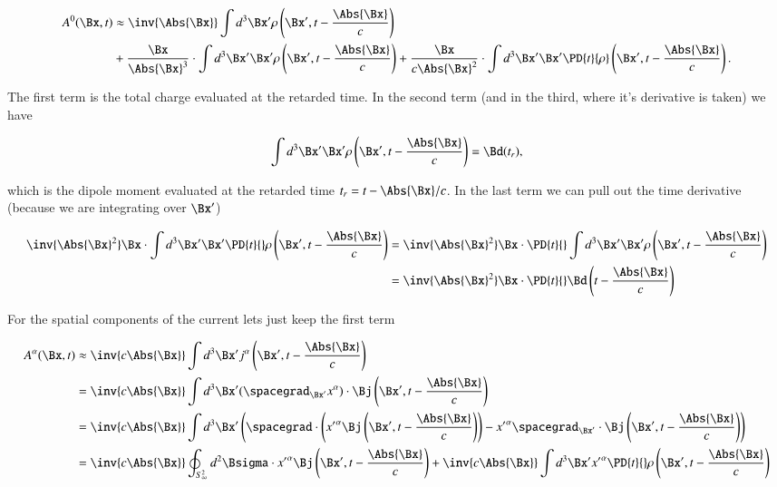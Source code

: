 \begin{equation}\label{eqn:relativisticElectrodynamicsL20:210}
\begin{aligned}
A^0(\Bx, t) 
&\approx 
\inv{\Abs{\Bx} } \int d^3 \Bx' \rho\left(\Bx', t - \frac{\Abs{\Bx} }{c}\right) \\
&+\frac{\Bx}{\Abs{\Bx}^3} \cdot \int d^3 \Bx' \Bx' \rho \left(\Bx', t - \frac{\Abs{\Bx} }{c}\right)
+\frac{\Bx}{c \Abs{\Bx}^2} \cdot \int d^3 \Bx' \Bx' \PD{t}{\rho}\left(\Bx', t - \frac{\Abs{\Bx} }{c}\right).
\end{aligned}
\end{equation}

The first term is the total charge evaluated at the retarded time.  In the second term (and in the third, where it's derivative is taken) we have

\begin{equation}\label{eqn:relativisticElectrodynamicsL20:230}
\int d^3 \Bx' \Bx' \rho\left(\Bx', t - \frac{\Abs{\Bx} }{c}\right) = \Bd(t_r),
\end{equation}

which is the dipole moment evaluated at the retarded time $t_r = t - \Abs{\Bx}/c$.  In the last term we can pull out the time derivative (because we are integrating over $\Bx'$)

\begin{align*}
\inv{\Abs{\Bx}^2} \Bx \cdot \int d^3 \Bx' \Bx' \PD{t}{} \rho\left(\Bx', t - \frac{\Abs{\Bx} }{c}\right)
&=
\inv{\Abs{\Bx}^2} \Bx \cdot \PD{t}{} \int d^3 \Bx' \Bx' \rho\left(\Bx', t - \frac{\Abs{\Bx} }{c}\right) \\
&=
\inv{\Abs{\Bx}^2} \Bx \cdot \PD{t}{}\Bd \left(t - \frac{\Abs{\Bx} }{c}\right)
\end{align*}

For the spatial components of the current lets just keep the first term

\begin{align*}
A^\alpha(\Bx, t) 
&\approx
\inv{ c \Abs{\Bx} } \int d^3 \Bx' j^\alpha\left(\Bx', t - \frac{\Abs{\Bx} }{c}\right) \\
&=
\inv{ c \Abs{\Bx} } \int d^3 \Bx' (\spacegrad_{\Bx'} x^\alpha) \cdot \Bj\left(\Bx', t - \frac{\Abs{\Bx} }{c}\right)  \\
&=
\inv{ c \Abs{\Bx} } \int d^3 \Bx' 
\left(
\spacegrad \cdot \left( {x'}^\alpha \Bj \left(\Bx', t - \frac{\Abs{\Bx} }{c}\right) \right)
- {x'}^\alpha \spacegrad_{\Bx'} \cdot \Bj\left(\Bx', t - \frac{\Abs{\Bx} }{c}\right) 
\right) \\
&=
\inv{ c \Abs{\Bx} } \oint_{S^2_\infty} d^2 \Bsigma \cdot {x'}^\alpha \Bj\left(\Bx', t - \frac{\Abs{\Bx} }{c}\right)
+\inv{ c \Abs{\Bx} } \int d^3 \Bx' {x'}^\alpha \PD{t}{}\rho\left(\Bx', t - \frac{\Abs{\Bx} }{c}\right)
\end{align*}

